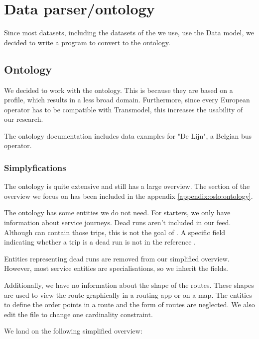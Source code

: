 \section{Data parser/ontology}\label{section:implementation_data_ontology}
Since most datasets, including the datasets of the  we use, use the  Data model, we decided to write a program to convert  to the  ontology.
\subsection{Ontology}
We decided to work with the  ontology. This is because they are based on a  profile, which results in a less broad domain. Furthermore, since every European operator has to be compatible with Transmodel, this increases the usability of our research.

The ontology documentation includes data examples for "De Lijn", a Belgian bus operator. 

\subsubsection{Simplyfications}
The ontology is quite extensive and still has a large overview. The section of the overview we focus on has been included in the appendix \ref{appendix:oslo:ontology}. 

The ontology has some entities we do not need. For starters, we only have information about service journeys. Dead runs aren't included in our feed. Although  can contain those trips, this is not the goal of . A specific field indicating whether a trip is a dead run is not in the reference \cite{noauthor_gtfs_2022}.

Entities representing dead runs are removed from our simplified overview. However, most service entities are specialisations, so we inherit the fields.

Additionally, we have no information about the shape of the routes. These shapes are used to view the route graphically in a routing app or on a map. The entities to define the order points in a route and the form of routes are neglected. We also edit the  file to change one cardinality constraint. 


We land on the following simplified overview:



